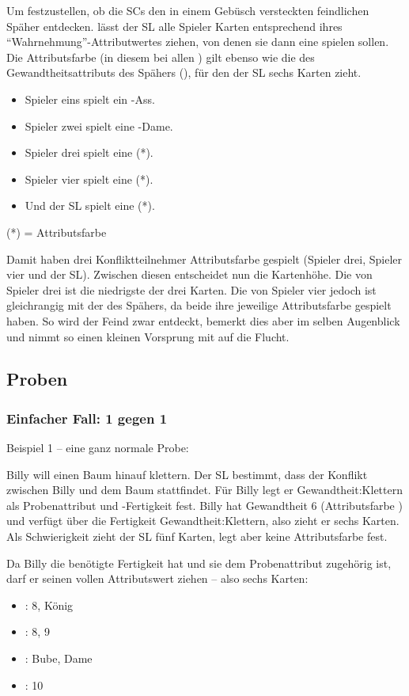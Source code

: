 Um festzustellen, ob die SCs den in einem Gebüsch versteckten feindlichen Späher entdecken. lässt der SL alle Spieler Karten entsprechend ihres "`Wahrnehmung"'-Attributwertes ziehen, von denen sie dann eine spielen sollen. Die Attributsfarbe (in diesem bei allen \karo) gilt ebenso wie die des Gewandtheitsattributs des Spähers (\pik), für den der SL sechs Karten zieht.
\begin {itemize}
\item Spieler eins spielt ein \kreuz-Ass.
\item Spieler zwei spielt eine \herz-Dame.
\item Spieler drei spielt eine  (*).
\item Spieler vier spielt eine  (*).
\item Und der SL spielt eine  (*).
\end {itemize}
(*) = Attributsfarbe

Damit haben drei Konfliktteilnehmer Attributsfarbe gespielt (Spieler drei, Spieler vier und der SL). Zwischen diesen entscheidet nun die Kartenhöhe. Die  von Spieler drei ist die niedrigste der drei Karten. Die  von Spieler vier jedoch ist gleichrangig mit der  des Spähers, da beide ihre jeweilige Attributsfarbe gespielt haben. So wird der Feind zwar entdeckt, bemerkt dies aber im selben Augenblick und nimmt so einen kleinen Vorsprung mit auf die Flucht.

\twocolumn
\subsection {Proben}
\subsubsection {Einfacher Fall: 1 gegen 1}

Beispiel 1 -- eine ganz normale Probe:

Billy will einen Baum hinauf klettern. Der SL bestimmt, dass der Konflikt zwischen Billy und dem Baum stattfindet. Für Billy legt er Gewandtheit:Klettern als Probenattribut und -Fertigkeit fest. Billy hat Gewandtheit 6 (Attributsfarbe \kreuz) und verfügt über die Fertigkeit Gewandtheit:Klettern, also zieht er sechs Karten. Als Schwierigkeit zieht der SL fünf Karten, legt aber keine Attributsfarbe fest.

Da Billy die benötigte Fertigkeit hat und sie dem Probenattribut zugehörig ist, darf er seinen vollen Attributswert ziehen -- also sechs Karten:
\begin {itemize}
\item \herz: 8, König
\item \karo: 8, 9
\item \pik: Bube, Dame
\item \kreuz: 10
\end {itemize}

